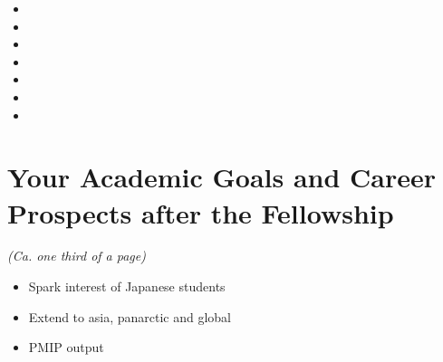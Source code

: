 \documentclass{article}
\begin{document}
    \begin{itemize}
      \item{}
      \item{}
      \item{}
      \item{}
      \item{}
      \item{}
      \item{}
    \end{itemize}


\section{Your Academic Goals and Career Prospects after the Fellowship}

    \emph{(Ca. one third of a page)}

    \begin{itemize}
      \item{Spark interest of Japanese students}
      \item{Extend to asia, panarctic and global}
      \item{PMIP output}
    \end{itemize}

\end{document}
